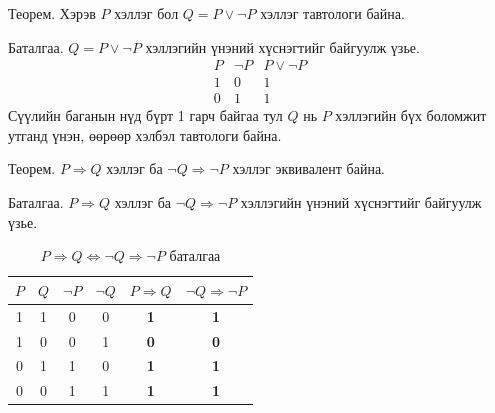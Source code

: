 \begin{example}
   Теорем.  Хэрэв $P$ хэллэг бол $Q=P\lor\lnot P$ хэллэг тавтологи байна.

   Баталгаа.  $Q=P\lor\lnot P$ хэллэгийн үнэний хүснэгтийг байгуулж үзье. 
   \[
\begin{array}{c|c|c}
P & \lnot P & P\lor\lnot P\\\hline
1 & 0 & 1\\
0 & 1 & 1
\end{array}
\]
Сүүлийн баганын нүд бүрт 1 гарч байгаа тул $Q$ нь $P$ хэллэгийн бүх боломжит утганд үнэн, өөрөөр хэлбэл тавтологи байна.
\end{example}
\begin{example}\label{Урвуу хэллэг}
 Теорем. $P\Rightarrow Q$ хэллэг ба $\lnot Q\Rightarrow \lnot P$ хэллэг эквивалент байна.

   Баталгаа.  $P\Rightarrow Q$ хэллэг ба $\lnot Q\Rightarrow \lnot P$ хэллэгийн үнэний хүснэгтийг байгуулж үзье. 
\begin{table}[h]
\centering
\begin{tabular}{c|c|c|c|c|c}
$P$ & $Q$ & $\neg P$ & $\neg Q$ & $P \Rightarrow Q$ & $\neg Q \Rightarrow \neg P$ \\ \hline
1   & 1   & 0        & 0        & \textbf{1}        & \textbf{1}        \\ 
1   & 0   & 0        & 1        & \textbf{0}        & \textbf{0}        \\ 
0   & 1   & 1        & 0        & \textbf{1}        & \textbf{1}        \\
0   & 0   & 1        & 1        & \textbf{1}        & \textbf{1}        \\ 
\end{tabular}
\caption*{$P \Rightarrow Q \Leftrightarrow \neg Q \Rightarrow \neg P$ баталгаа}
\end{table}
\end{example}
\newpage
